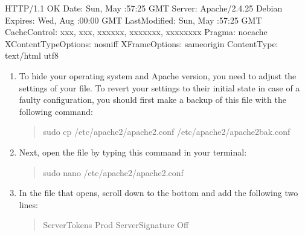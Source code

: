 \documentclass[a4paper,10pt,english,openany,oneside]{sphinxmanual}
\begin{document}
\begin{sloppypar}
\begin{sphinxVerbatim}[commandchars=\\\{\},numbers=left,firstnumber=1,stepnumber=1]
HTTP/1.1  OK
Date: Sun,  May  :57:25 GMT
Server: Apache/2.4.25 Debian
Expires: Wed,  Aug  :00:00 GMT
Last\PYGZhy{}Modified: Sun,  May  :57:25 GMT
Cache\PYGZhy{}Control: xxx, xxx, xxx\PYGZhy{}xxx, xxxxxxx, xxxxxxxx
Pragma: no\PYGZhy{}cache
X\PYGZhy{}Content\PYGZhy{}Type\PYGZhy{}Options: nosniff
X\PYGZhy{}Frame\PYGZhy{}Options: sameorigin
Content\PYGZhy{}Type: text/html utf\PYGZhy{}8
\end{sphinxVerbatim}
\begin{enumerate}
%
\item {} 
\sphinxAtStartPar
To hide your operating system and Apache version, you need to adjust the settings of your  file. To revert your settings to their initial state in case of a faulty configuration, you should first make a backup of this file with the following command:
\begin{quote}

\begin{sphinxVerbatim}[commandchars=\\\{\}]
\PYGZdl{} sudo cp /etc/apache2/apache2.conf /etc/apache2/apache2\PYGZus{}bak.conf
\end{sphinxVerbatim}
\end{quote}

\item {} 
\sphinxAtStartPar
Next, open the  file by typing this command in your terminal:
\begin{quote}

\begin{sphinxVerbatim}[commandchars=\\\{\}]
\PYGZdl{} sudo nano /etc/apache2/apache2.conf
\end{sphinxVerbatim}
\end{quote}

\item {} 
\sphinxAtStartPar
In the file that opens, scroll down to the bottom and add the following two lines:
\begin{quote}

\begin{sphinxVerbatim}[commandchars=\\\{\}]
ServerTokens Prod
ServerSignature Off
\end{sphinxVerbatim}
\end{quote}


\end{enumerate}
\end{sloppypar}
\end{document}
